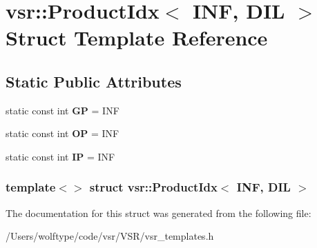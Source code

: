 \hypertarget{structvsr_1_1_product_idx_3_01_i_n_f_00_01_d_i_l_01_4}{\section{vsr\-:\-:Product\-Idx$<$ I\-N\-F, D\-I\-L $>$ Struct Template Reference}
\label{structvsr_1_1_product_idx_3_01_i_n_f_00_01_d_i_l_01_4}
}
\subsection*{Static Public Attributes}
\begin{DoxyCompactItemize}
\item 
\hypertarget{structvsr_1_1_product_idx_3_01_i_n_f_00_01_d_i_l_01_4_aa824934e194869a53aa7f684a58ed74c}{static const int {\bfseries G\-P} = I\-N\-F}\label{structvsr_1_1_product_idx_3_01_i_n_f_00_01_d_i_l_01_4_aa824934e194869a53aa7f684a58ed74c}

\item 
\hypertarget{structvsr_1_1_product_idx_3_01_i_n_f_00_01_d_i_l_01_4_a23c7b24cec24ab96fb1a56094943bf91}{static const int {\bfseries O\-P} = I\-N\-F}\label{structvsr_1_1_product_idx_3_01_i_n_f_00_01_d_i_l_01_4_a23c7b24cec24ab96fb1a56094943bf91}

\item 
\hypertarget{structvsr_1_1_product_idx_3_01_i_n_f_00_01_d_i_l_01_4_aaedd2c5a80d4691f215fdb8de49389e8}{static const int {\bfseries I\-P} = I\-N\-F}\label{structvsr_1_1_product_idx_3_01_i_n_f_00_01_d_i_l_01_4_aaedd2c5a80d4691f215fdb8de49389e8}

\end{DoxyCompactItemize}
\subsubsection*{template$<$$>$ struct vsr\-::\-Product\-Idx$<$ I\-N\-F, D\-I\-L $>$}



The documentation for this struct was generated from the following file\-:\begin{DoxyCompactItemize}
\item 
/\-Users/wolftype/code/vsr/\-V\-S\-R/vsr\-\_\-templates.\-h\end{DoxyCompactItemize}
